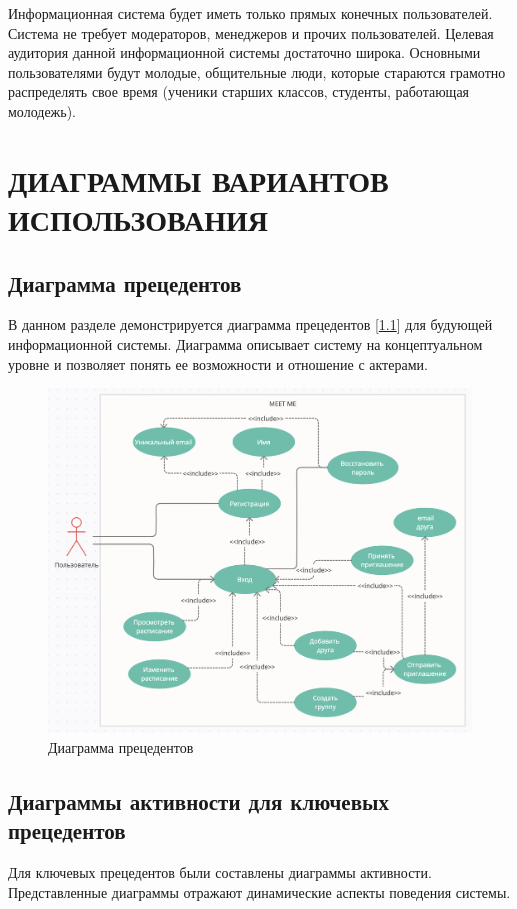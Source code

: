 \documentclass[14pt]{extreport}
\begin{document}
Информационная система будет иметь только прямых конечных пользователей. Система не требует модераторов, менеджеров и прочих пользователей.
Целевая аудитория данной информационной системы достаточно широка. Основными пользователями будут молодые, общительные люди, которые стараются грамотно распределять свое время (ученики старших классов, студенты, работающая молодежь).


\chapter{ДИАГРАММЫ ВАРИАНТОВ ИСПОЛЬЗОВАНИЯ}

\section{Диаграмма прецедентов}
В данном разделе демонстрируется диаграмма прецедентов [\ref{fig:d1}]  для будующей информационной системы. Диаграмма описывает систему на концептуальном уровне и позволяет понять ее возможности и отношение с актерами.
\begin{figure}[h]   
    \centering
    \includegraphics[width=0.8\linewidth]{img/d1.png}
    \caption{ Диаграмма прецедентов}
    \label{fig:d1}
\end{figure}

\section{Диаграммы активности для ключевых прецедентов}
Для ключевых прецедентов были составлены диаграммы активности. Представленные диаграммы отражают динамические аспекты поведения системы.
\end{document}
